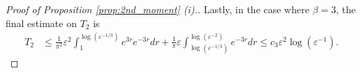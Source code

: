 \documentclass[10pt,a4paper]{amsart}
\newcommand*{\eps}{\ensuremath{\varepsilon}}            %
\begin{document}
\begin{proof}[Proof of Proposition \ref{prop:2nd_moment} (i).]
Lastly, in the case where $\beta=3$, the final estimate on $T_2$ is 
\begin{align}
    T_2 &\leq \frac{1}{\pi^2}\eps^2\int_1^{\log(\eps^{-1/3})} e^{3r}e^{-3 r}dr + \frac{1}{\pi}\eps\int_{\log(\eps^{-1/3})}^{\log(\eps^{-2})}e^{-3 r}dr \nonumber\leq c_3 \eps^2 \log(\eps^{-1}). 
\end{align}
\end{proof}
\end{document}
